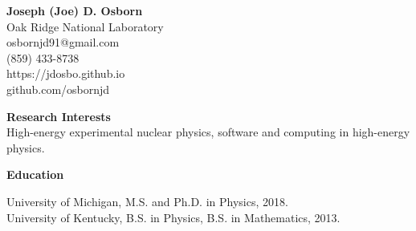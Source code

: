 \documentclass[11pt]{article}
\begin{document}

\begin{center}
\Large\textbf{Joseph (Joe) D. Osborn} \\
\normalsize Oak Ridge National Laboratory \\
osbornjd91@gmail.com \\
(859) 433-8738 \\
https://jdosbo.github.io \\
github.com/osbornjd
\end{center}



\begin{flushleft}
\Large\textbf{Research Interests} \\
\normalsize High-energy experimental nuclear physics, software and computing in high-energy physics.  \\ 
\end{flushleft}











\vspace{3pt}
\begin{flushleft}
\Large\textbf{Education} \\
\normalsize 

University of Michigan, M.S. and Ph.D. in Physics, 2018. \\
University of Kentucky, B.S. in Physics, B.S. in Mathematics, 2013.\\


\end{flushleft}
\end{document}

